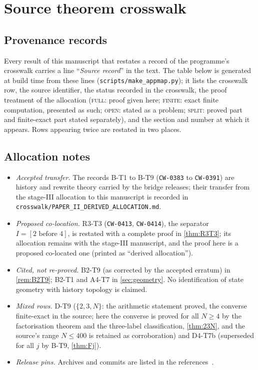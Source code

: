 \section{Source theorem crosswalk}\label{app:crosswalk}
\subsection{Provenance records}
Every result of this manuscript that restates a record of the programme's crosswalk carries a line ``\emph{Source record}'' in the text. The table below is generated at build time from these lines (\texttt{scripts/make\_appmap.py}); it lists the crosswalk row, the source identifier, the status recorded in the crosswalk, the proof treatment of the allocation (\textsc{full}: proof given here; \textsc{finite}: exact finite computation, presented as such; \textsc{open}: stated as a problem; \textsc{split}: proved part and finite-exact part stated separately), and the section and number at which it appears. Rows appearing twice are restated in two places.

\subsection{Allocation notes}
\begin{itemize}[leftmargin=1.6em,itemsep=2pt]
\item \emph{Accepted transfer.} The records B-T1 to B-T9 (\texttt{CW-0383} to \texttt{CW-0391}) are history and rewrite theory carried by the bridge releases; their transfer from the stage-III allocation to this manuscript is recorded in \texttt{crosswalk/PAPER\_II\_DERIVED\_ALLOCATION.md}.
\item \emph{Proposed co-location.} R3-T3 (\texttt{CW-0413}, \texttt{CW-0414}), the separator $I=[2\text{ before }4]$, is restated with a complete proof in \cref{thm:R3T3}; its allocation remains with the stage-III manuscript, and the proof here is a proposed co-located one (printed as ``derived allocation'').
\item \emph{Cited, not re-proved.} B2-T9 (as corrected by the accepted erratum) in \cref{rem:B2T9}; B2-T1 and A4-T7 in \cref{sec:geometry}. No identification of state geometry with history topology is claimed.
\item \emph{Mixed rows.} D-T9 ($\{2,3,N\}$: the arithmetic statement proved, the converse finite-exact in the source; here the converse is proved for all $N\ge4$ by the factorisation theorem and the three-label classification, \cref{thm:23N}, and the source's range $N\le400$ is retained as corroboration) and D4-T7b (superseded for all $j$ by B-T9, \cref{thm:Fj}).
\item \emph{Release pins.} Archives and commits are listed in the references~\cite{HD1,FoundI,RefColl}.
\end{itemize}
